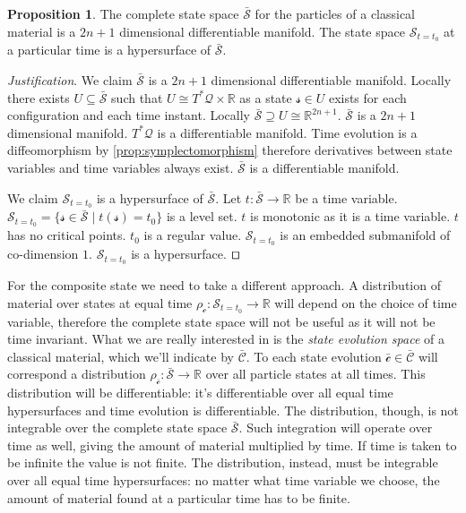 \documentclass[smallextended]{svjour3}
\numberwithin{equation}{section}
\newenvironment{justification}{\emph{Justification}.}{\hfill\(\qed\)}
\theoremstyle{definition}
\newtheorem{prop}[equation]{Proposition}
\newenvironment{justification}{\emph{Justification}.}{\qed}
\begin{document}
\begin{prop}\label{prop:complete_particle_state_space}
	The complete state space $\bar{\mathcal{S}}$ for the particles of a classical material is a $2n+1$ dimensional differentiable manifold. The state space $\mathcal{S}_{t=t_0}$ at a particular time is a hypersurface of $\bar{\mathcal{S}}$.
\end{prop}

\begin{justification}
	We claim $\bar{\mathcal{S}}$ is a $2n+1$ dimensional differentiable manifold. Locally there exists $U\subseteq \bar{\mathcal{S}}$ such that $U \cong T^*\mathcal{Q}\times \mathbb{R}$ as a state $\mathcal{s} \in U$ exists for each configuration and each time instant. Locally $\bar{\mathcal{S}} \supseteq U \cong\mathbb{R}^{2n+1}$. $\bar{\mathcal{S}}$ is a $2n+1$ dimensional manifold. $T^*\mathcal{Q}$ is a differentiable manifold. Time evolution is a diffeomorphism by \ref{prop:symplectomorphism} therefore derivatives between state variables and time variables always exist. $\bar{\mathcal{S}}$ is a differentiable manifold.
	
	We claim $\mathcal{S}_{t=t_0}$ is a hypersurface of $\bar{\mathcal{S}}$. Let $t : \bar{\mathcal{S}} \rightarrow \mathbb{R}$ be a time variable. $\mathcal{S}_{t=t_0} = \{ \mathcal{s} \in \bar{\mathcal{S}} \; | \; t(\mathcal{s}) = t_0 \}$ is a level set. $t$ is monotonic as it is a time variable. $t$ has no critical points. $t_0$ is a regular value. $\mathcal{S}_{t=t_0}$ is an embedded submanifold of co-dimension $1$. $\mathcal{S}_{t=t_0}$ is a hypersurface.
\end{justification}

For the composite state we need to take a different approach. A distribution of material over states at equal time $\rho_\mathcal{c} : \mathcal{S}_{t=t_0} \rightarrow \mathbb{R}$ will depend on the choice of time variable, therefore the complete state space will not be useful as it will not be time invariant. What we are really interested in is the \emph{state evolution space} of a classical material, which we'll indicate by $\bar{\mathcal{C}}$. To each state evolution $\bar{\mathcal{c}} \in \bar{\mathcal{C}}$ will correspond a distribution $\rho_{\bar{\mathcal{c}}} : \bar{\mathcal{S}} \rightarrow \mathbb{R}$ over all particle states at all times. This distribution will be differentiable: it's differentiable over all equal time hypersurfaces and time evolution is differentiable. The distribution, though, is not integrable over the complete state space $\bar{\mathcal{S}}$. Such integration will operate over time as well, giving the amount of material multiplied by time. If time is taken to be infinite the value is not finite. The distribution, instead, must be integrable over all equal time hypersurfaces: no matter what time variable we choose, the amount of material found at a particular time has to be finite.
\end{document}

